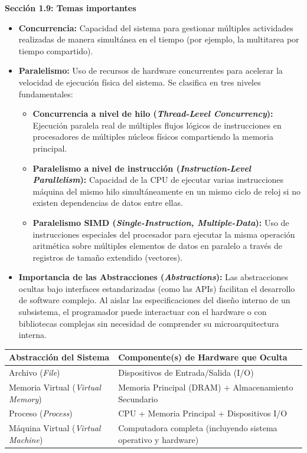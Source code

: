 \documentclass[11pt, a4paper]{article}
\begin{document}
\noindent\textbf{Sección 1.9: Temas importantes}\\[0.5em]
\begin{itemize}
  \item \textbf{Concurrencia:} Capacidad del sistema para gestionar múltiples actividades realizadas de manera simultánea en el tiempo (por ejemplo, la multitarea por tiempo compartido).
  \item \textbf{Paralelismo:} Uso de recursos de hardware concurrentes para acelerar la velocidad de ejecución física del sistema. Se clasifica en tres niveles fundamentales:
  \begin{itemize}
    \item \textbf{Concurrencia a nivel de hilo (\textit{Thread-Level Concurrency}):} Ejecución paralela real de múltiples flujos lógicos de instrucciones en procesadores de múltiples núcleos físicos compartiendo la memoria principal.
    \item \textbf{Paralelismo a nivel de instrucción (\textit{Instruction-Level Parallelism}):} Capacidad de la CPU de ejecutar varias instrucciones máquina del mismo hilo simultáneamente en un mismo ciclo de reloj si no existen dependencias de datos entre ellas.
    \item \textbf{Paralelismo SIMD (\textit{Single-Instruction, Multiple-Data}):} Uso de instrucciones especiales del procesador para ejecutar la misma operación aritmética sobre múltiples elementos de datos en paralelo a través de registros de tamaño extendido (vectores).
  \end{itemize}
  \item \textbf{Importancia de las Abstracciones (\textit{Abstractions}):} Las abstracciones ocultas bajo interfaces estandarizadas (como las APIs) facilitan el desarrollo de software complejo. Al aislar las especificaciones del diseño interno de un subsistema, el programador puede interactuar con el hardware o con bibliotecas complejas sin necesidad de comprender su microarquitectura interna.
\end{itemize}

\begin{center}
\small
\begin{tabular}{lp{8.5cm}}
\toprule
\textbf{Abstracción del Sistema} & \textbf{Componente(s) de Hardware que Oculta} \\
\midrule
Archivo (\textit{File}) & Dispositivos de Entrada/Salida (I/O) \\
Memoria Virtual (\textit{Virtual Memory}) & Memoria Principal (DRAM) + Almacenamiento Secundario \\
Proceso (\textit{Process}) & CPU + Memoria Principal + Dispositivos I/O \\
Máquina Virtual (\textit{Virtual Machine}) & Computadora completa (incluyendo sistema operativo y hardware) \\
\bottomrule
\end{tabular}
\end{center}
\end{document}
